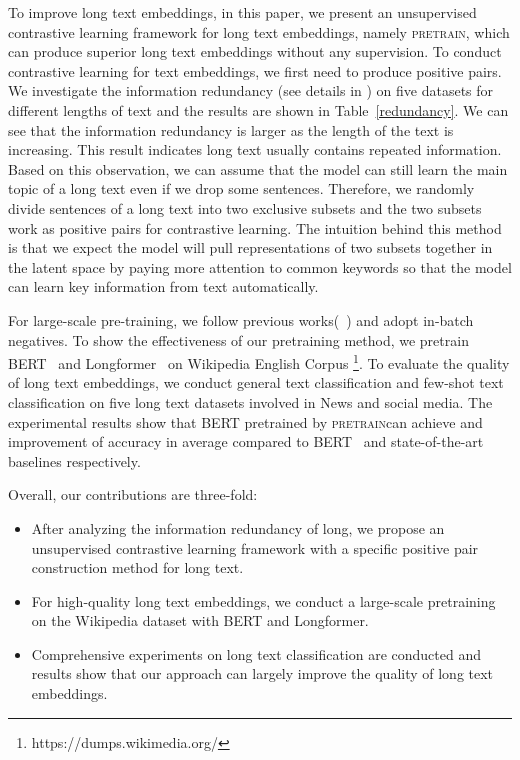\documentclass[11pt]{article}
\newcommand{\todo}[1]{{\color{red}{#1}}}
\newcommand{\our}{\mbox{\textsc{pretrain}}}
\begin{document}
\begin{table}
    
    \caption{Information redundancies for different lengths (i.e.,~word numbers) of text: (1) 0-50 (2) 51-100 (3) 101-200 (4) 201-300 (5) more than 300.}
    \label{redundancy}
\end{table}
To improve long text embeddings, in this paper, we present an unsupervised contrastive learning framework for long text embeddings, namely \our, which can produce superior long text embeddings without any supervision.
To conduct contrastive learning for text embeddings, we first need to produce positive pairs.
We investigate the information redundancy (see details in \todo{Appendix}) on five datasets for different lengths of text and the results are shown in Table~\ref{redundancy}.
We can see that the information redundancy is larger as the length of the text is increasing. 
This result indicates long text usually contains repeated information. 
Based on this observation, we can assume that the model can still learn the main topic of a long text even if we drop some sentences. 
Therefore, we randomly divide sentences of a long text into two exclusive subsets and the two subsets work as positive pairs for contrastive learning. 
The intuition behind this method is that we expect the model will pull representations of two subsets together in the latent space by paying more attention to common keywords so that the model can learn key information from text automatically. 

For large-scale pre-training, we follow previous works(~\cite{Gao2021SimCSESC, Li2022UCTopicUC}) and adopt in-batch negatives. 
To show the effectiveness of our pretraining method, we pretrain BERT~\cite{Devlin2019BERTPO} and Longformer~\cite{Beltagy2020LongformerTL} on Wikipedia English Corpus \footnote{https://dumps.wikimedia.org/}.
To evaluate the quality of long text embeddings, we conduct general text classification and few-shot text classification on five long text datasets involved in News and social media. 
The experimental results show that BERT pretrained by \our can achieve \todo{NUM} and \todo{NUM} improvement of accuracy in average compared to BERT~\cite{Devlin2019BERTPO} and state-of-the-art baselines respectively.

Overall, our contributions are three-fold: 
\begin{itemize}[nosep,leftmargin=*]
    \item After analyzing the information redundancy of long, we propose an unsupervised contrastive learning framework with a specific positive pair construction method for long text.
    \item For high-quality long text embeddings, we conduct a large-scale pretraining on the Wikipedia dataset with BERT and Longformer.
    \item Comprehensive experiments on long text classification are conducted and results show that our approach can largely improve the quality of long text embeddings.
\end{itemize}
\end{document}
